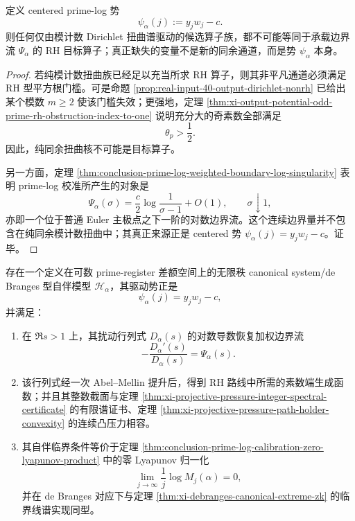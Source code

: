 \begin{corollary}\label{cor:conclusion-prime-log-congruence-kernel-not-rh-operator}
定义 centered prime-log 势
\[
\psi_\alpha(j):=y_jw_j-c.
\]
则任何仅由模计数 Dirichlet 扭曲谱驱动的候选算子族，都不可能等同于承载边界流 \(\Psi_\alpha\) 的 RH 目标算子；真正缺失的变量不是新的同余通道，而是势 \(\psi_\alpha\) 本身。
\end{corollary}
\begin{proof}
若纯模计数扭曲族已经足以充当所求 RH 算子，则其非平凡通道必须满足 RH 型平方根门槛。可是命题 \ref{prop:real-input-40-output-dirichlet-nonrh} 已给出某个模数 \(m\ge 2\) 使该门槛失效；更强地，定理 \ref{thm:xi-output-potential-odd-prime-rh-obstruction-index-to-one} 说明充分大的奇素数全部满足
\[
\theta_p>\frac12.
\]
因此，纯同余扭曲核不可能是目标算子。

另一方面，定理 \ref{thm:conclusion-prime-log-weighted-boundary-log-singularity} 表明 prime-log 校准所产生的对象是
\[
\Psi_\alpha(\sigma)
=
\frac{c}{2}\log\frac{1}{\sigma-1}+O(1),
\qquad
\sigma\downarrow 1,
\]
亦即一个位于普通 Euler 主极点之下一阶的对数边界流。这个连续边界量并不包含在纯同余模计数扭曲中；其真正来源正是 centered 势 \(\psi_\alpha(j)=y_jw_j-c\)。证毕。
\end{proof}

\begin{conjecture}\label{conj:conclusion-prime-log-canonical-system}
存在一个定义在可数 prime-register 差额空间上的无限秩 canonical system/de Branges 型自伴模型 \(\mathcal H_\alpha\)，其驱动势正是
\[
\psi_\alpha(j)=y_jw_j-c,
\]
并满足：
\begin{enumerate}
  \item 在 \(\Re s>1\) 上，其扰动行列式 \(D_\alpha(s)\) 的对数导数恢复加权边界流
  \[
  -\frac{D_\alpha'(s)}{D_\alpha(s)}=\Psi_\alpha(s).
  \]
  \item 该行列式经一次 Abel--Mellin 提升后，得到 RH 路线中所需的素数端生成函数；并且其整数截面与定理 \ref{thm:xi-projective-pressure-integer-spectral-certificate} 的有限谱证书、定理 \ref{thm:xi-projective-pressure-path-holder-convexity} 的连续凸压力相容。
  \item 其自伴临界条件等价于定理 \ref{thm:conclusion-prime-log-calibration-zero-lyapunov-product} 中的零 Lyapunov 归一化
  \[
  \lim_{j\to\infty}\frac{1}{j}\log M_j(\alpha)=0,
  \]
  并在 de Branges 对应下与定理 \ref{thm:xi-debranges-canonical-extreme-zk} 的临界线谱实现同型。
\end{enumerate}
\end{conjecture}

